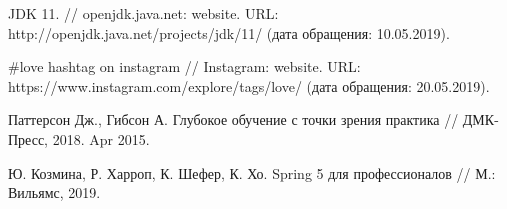 \begin{thebibliography}{00}
    JDK 11. // 
    openjdk.java.net: website. 
    URL: http://openjdk.java.net/projects/jdk/11/
    (дата обращения: 10.05.2019).

    \#love hashtag on instagram // 
    Instagram: website. 
    URL: https://www.instagram.com/explore/tags/love/ 
    (дата обращения: 20.05.2019).

    Паттерсон Дж., Гибсон А. 
    Глубокое обучение с точки зрения практика //
    ДМК-Пресс, 
    2018.
    Apr 2015.

    Ю. Козмина, Р. Харроп, К. Шефер, К. Хо. 
    Spring 5 для профессионалов //
    М.: Вильямс, 
    2019.

\end{thebibliography}
\endgroup

\clearpage